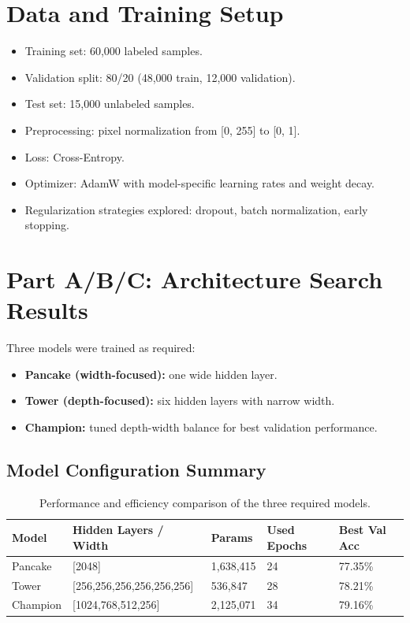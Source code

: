 \documentclass[11pt,a4paper]{article}
\begin{document}
\section{Data and Training Setup}
\begin{itemize}[leftmargin=1.5em]
    \item Training set: 60,000 labeled samples.
    \item Validation split: 80/20 (48,000 train, 12,000 validation).
    \item Test set: 15,000 unlabeled samples.
    \item Preprocessing: pixel normalization from [0, 255] to [0, 1].
    \item Loss: Cross-Entropy.
    \item Optimizer: AdamW with model-specific learning rates and weight decay.
    \item Regularization strategies explored: dropout, batch normalization, early stopping.
\end{itemize}

\section{Part A/B/C: Architecture Search Results}
Three models were trained as required:
\begin{itemize}[leftmargin=1.5em]
    \item \textbf{Pancake (width-focused):} one wide hidden layer.
    \item \textbf{Tower (depth-focused):} six hidden layers with narrow width.
    \item \textbf{Champion:} tuned depth-width balance for best validation performance.
\end{itemize}

\subsection{Model Configuration Summary}
\begin{table}[H]
\centering
\begin{tabular}{p{}p{}p{}p{}p{}}
\toprule
Model & Hidden Layers / Width & Params & Used Epochs & Best Val Acc \\
\midrule
Pancake & [2048] & 1,638,415 & 24 & 77.35\% \\
Tower & [256,256,256,256,256,256] & 536,847 & 28 & 78.21\% \\
Champion & [1024,768,512,256] & 2,125,071 & 34 & 79.16\% \\
\bottomrule
\end{tabular}
\caption{Performance and efficiency comparison of the three required models.}
\end{table}
\end{document}
